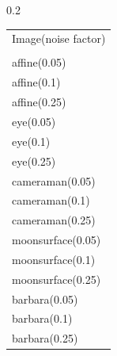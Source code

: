 \documentclass[twocolumn,envcountsame]{svjour3}
\begin{document}
\begin{table}[htb]                                                                   
\centering
\begin{subtable}[t]{0.2\linewidth}
\centering                                                                           
\begin{tabular}{l}                                                                 
\toprule                                                                             
Image(noise factor) \\                                                
\phantom{c}\\
\midrule                                                                             
affine(0.05) \\                                                  
affine(0.1) \\                                                   
affine(0.25) \\                                                  
\midrule
eye(0.05)\\                                                     
eye(0.1) \\                                                      
eye(0.25)\\                                                     
\midrule
cameraman(0.05) \\                                               
cameraman(0.1) \\                                                 
cameraman(0.25)  \\                                               
\midrule
moonsurface(0.05)\\                                             
moonsurface(0.1)  \\                                              
moonsurface(0.25) \\                                             
\midrule
barbara(0.05) \\                                                 
barbara(0.1) \\                                                   
barbara(0.25) \\                                                 
\bottomrule                                                                          
\end{tabular}                                                                        
\end{subtable}%

\end{table}
\end{document}
